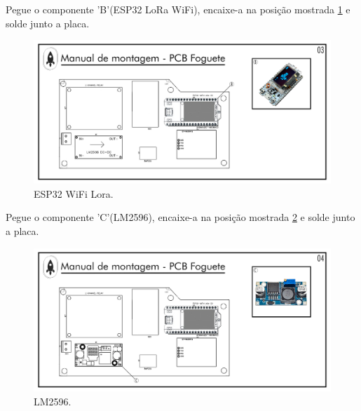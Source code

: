 \par Pegue o componente 'B'(ESP32 LoRa WiFi), encaixe-a na posição mostrada \ref{fig:PCIFoguete LORA} e solde junto a placa.
\begin{figure}[H]
  \centering
  \includegraphics[width=\textwidth]{Figuras/FOGUETE/Pg-03---PL-02.png}
  \caption{ESP32 WiFi Lora.}
  \label{fig:PCIFoguete LORA}
\end{figure}

\newpage

\par Pegue o componente 'C'(LM2596), encaixe-a na posição mostrada \ref{fig:PCIFoguete LM2596} e solde junto  a placa.
\begin{figure}[H]
  \centering
  \includegraphics[width=\textwidth]{Figuras/FOGUETE/Pg-04---PL-02.png}
  \caption{LM2596.}
  \label{fig:PCIFoguete LM2596}
\end{figure}


